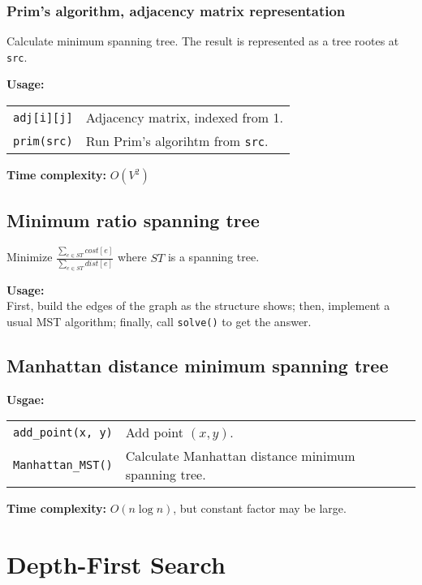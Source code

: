\subsubsection{Prim's algorithm, adjacency matrix representation}
Calculate minimum spanning tree. The result is represented as a tree rootes at \lstinline|src|. \par
\textbf{Usage:} \\[0.1cm]
\begin{tabular}{p{2.5cm} p{9cm}}
  \lstinline|adj[i][j]| & Adjacency matrix, indexed from 1. \\
  \lstinline|prim(src)| & Run Prim's algorihtm from \lstinline|src|. \\
\end{tabular} \par
\textbf{Time complexity:} $O(V^2)$ \par


\subsection{Minimum ratio spanning tree}
Minimize $\frac{\sum_{e \in ST} cost[e]}{\sum_{e \in ST} dist[e]}$ where $ST$ is a spanning tree. \par
\textbf{Usage:} \\[0.1cm]
First, build the edges of the graph as the structure shows; then, implement a usual MST algorithm; finally, call \lstinline|solve()| to get the answer. \par


\subsection{Manhattan distance minimum spanning tree}
\textbf{Usgae:} \\[0.1cm]
\begin{tabular}{p{3cm} p{9cm}}
  \lstinline|add_point(x, y)| & Add point $(x, y)$. \\
  \lstinline|Manhattan_MST()| & Calculate Manhattan distance minimum spanning tree.
\end{tabular} \par
\textbf{Time complexity:} $O(n \log n)$, but constant factor may be large. \par


\section{Depth-First Search}
